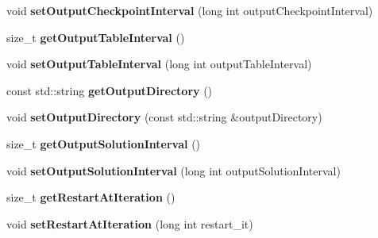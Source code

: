 \begin{DoxyCompactItemize}
\item 
\hypertarget{classnatrium_1_1SolverConfiguration_ab7a39dfb46cb1b0c7b54b92700fd7360}{
void {\bfseries setOutputCheckpointInterval} (long int outputCheckpointInterval)}
\label{classnatrium_1_1SolverConfiguration_ab7a39dfb46cb1b0c7b54b92700fd7360}

\item 
\hypertarget{classnatrium_1_1SolverConfiguration_a6c0fb63902a6828c06c48918402375bb}{
size\_\-t {\bfseries getOutputTableInterval} ()}
\label{classnatrium_1_1SolverConfiguration_a6c0fb63902a6828c06c48918402375bb}

\item 
\hypertarget{classnatrium_1_1SolverConfiguration_a207c38e009015be45e74eaa86f9db7ad}{
void {\bfseries setOutputTableInterval} (long int outputTableInterval)}
\label{classnatrium_1_1SolverConfiguration_a207c38e009015be45e74eaa86f9db7ad}

\item 
\hypertarget{classnatrium_1_1SolverConfiguration_a2a0444878a5fb512772e024bc03ec076}{
const std::string {\bfseries getOutputDirectory} ()}
\label{classnatrium_1_1SolverConfiguration_a2a0444878a5fb512772e024bc03ec076}

\item 
\hypertarget{classnatrium_1_1SolverConfiguration_acd249488bb83773514c4d6917b5bfc3a}{
void {\bfseries setOutputDirectory} (const std::string \&outputDirectory)}
\label{classnatrium_1_1SolverConfiguration_acd249488bb83773514c4d6917b5bfc3a}

\item 
\hypertarget{classnatrium_1_1SolverConfiguration_aa7fdb1358469be8faf1cc14c64538927}{
size\_\-t {\bfseries getOutputSolutionInterval} ()}
\label{classnatrium_1_1SolverConfiguration_aa7fdb1358469be8faf1cc14c64538927}

\item 
\hypertarget{classnatrium_1_1SolverConfiguration_ab49c72f19d58f7408eb14ac7fd865b78}{
void {\bfseries setOutputSolutionInterval} (long int outputSolutionInterval)}
\label{classnatrium_1_1SolverConfiguration_ab49c72f19d58f7408eb14ac7fd865b78}

\item 
\hypertarget{classnatrium_1_1SolverConfiguration_af6ac0030408e960aa8c85cd3be2c7cce}{
size\_\-t {\bfseries getRestartAtIteration} ()}
\label{classnatrium_1_1SolverConfiguration_af6ac0030408e960aa8c85cd3be2c7cce}

\item 
\hypertarget{classnatrium_1_1SolverConfiguration_a478f757724a100f13cae07adb0b04be5}{
void {\bfseries setRestartAtIteration} (long int restart\_\-it)}
\label{classnatrium_1_1SolverConfiguration_a478f757724a100f13cae07adb0b04be5}


\end{DoxyCompactItemize}
